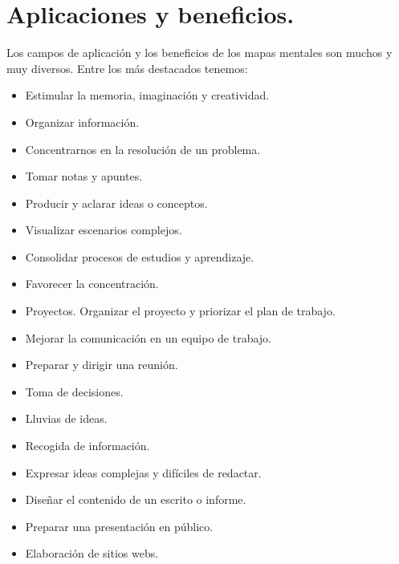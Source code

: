 \section{Aplicaciones y beneficios.}

Los campos de aplicación y los beneficios de los mapas mentales son muchos y muy diversos. Entre los más destacados tenemos:

\begin{itemize}
\item Estimular la memoria, imaginación y creatividad.
\item Organizar información.
\item Concentrarnos en la resolución de un problema.
\item Tomar notas y apuntes.
\item Producir y aclarar ideas o conceptos. 
\item Visualizar escenarios complejos.
\item Consolidar procesos de estudios y aprendizaje.
\item Favorecer la concentración.
\item Proyectos. Organizar el proyecto y priorizar el plan de trabajo.
\item Mejorar la comunicación en un equipo de trabajo.
\item Preparar y dirigir una reunión.
\item Toma de decisiones.
\item Lluvias de ideas.
\item Recogida de información.
\item Expresar ideas complejas y difíciles de redactar.
\item Diseñar el contenido de un escrito o informe.
\item Preparar una presentación en público.
\item Elaboración de sitios webs.
\end{itemize}


